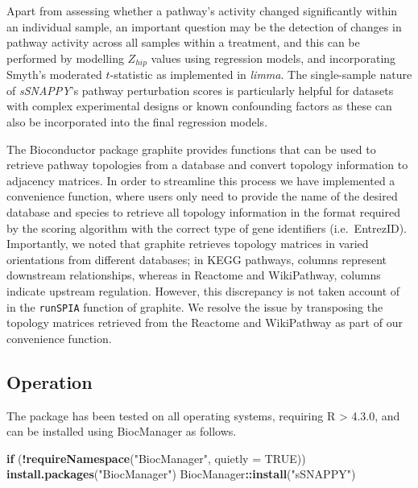\documentclass[9pt,a4paper,]{extarticle}
\newenvironment{Shaded}{\begin{snugshade}}{\end{snugshade}}
\newcommand{\AttributeTok}[1]{\textcolor[rgb]{0.13,0.29,0.53}{#1}}
\newcommand{\ConstantTok}[1]{\textcolor[rgb]{0.56,0.35,0.01}{#1}}
\newcommand{\ControlFlowTok}[1]{\textcolor[rgb]{0.13,0.29,0.53}{\textbf{#1}}}
\newcommand{\FunctionTok}[1]{\textcolor[rgb]{0.13,0.29,0.53}{\textbf{#1}}}
\newcommand{\NormalTok}[1]{#1}
\newcommand{\SpecialCharTok}[1]{\textcolor[rgb]{0.81,0.36,0.00}{\textbf{#1}}}
\newcommand{\StringTok}[1]{\textcolor[rgb]{0.31,0.60,0.02}{#1}}
\begin{document}
Apart from assessing whether a pathway's activity changed significantly within an individual sample, an important question may be the detection of changes in pathway activity across all samples within a treatment, and this can be performed by modelling \(Z_{hip}\) values using regression models, and incorporating Smyth's moderated \(t\)-statistic\citep{Smyth_2004} as implemented in \emph{limma}\citep{limma_2015}.
The single-sample nature of \emph{sSNAPPY}'s pathway perturbation scores is particularly helpful for datasets with complex experimental designs or known confounding factors as these can also be incorporated into the final regression models.

The Bioconductor package graphite\citep{Sales2012} provides functions that can be used to retrieve pathway topologies from a database and convert topology information to adjacency matrices.
In order to streamline this process we have implemented a convenience function, where users only need to provide the name of the desired database and species to retrieve all topology information in the format required by the scoring algorithm with the correct type of gene identifiers (i.e.~EntrezID).
Importantly, we noted that graphite\citep{Sales2012} retrieves topology matrices in varied orientations from different databases; in KEGG pathways, columns represent downstream relationships, whereas in Reactome and WikiPathway, columns indicate upstream regulation.
However, this discrepancy is not taken account of in the \texttt{runSPIA} function of graphite.
We resolve the issue by transposing the topology matrices retrieved from the Reactome and WikiPathway as part of our convenience function.

\hypertarget{operation}{%
\subsection{Operation}\label{operation}}

The package has been tested on all operating systems, requiring R \textgreater{} 4.3.0, and can be installed using BiocManager as follows.

\begin{Shaded}
\begin{Highlighting}[]
\ControlFlowTok{if}\NormalTok{ (}\SpecialCharTok{!}\FunctionTok{requireNamespace}\NormalTok{(}\StringTok{"BiocManager"}\NormalTok{, }\AttributeTok{quietly =} \ConstantTok{TRUE}\NormalTok{))}
  \FunctionTok{install.packages}\NormalTok{(}\StringTok{"BiocManager"}\NormalTok{)}
\NormalTok{BiocManager}\SpecialCharTok{::}\FunctionTok{install}\NormalTok{(}\StringTok{"sSNAPPY"}\NormalTok{)}
\end{Highlighting}
\end{Shaded}
\end{document}
